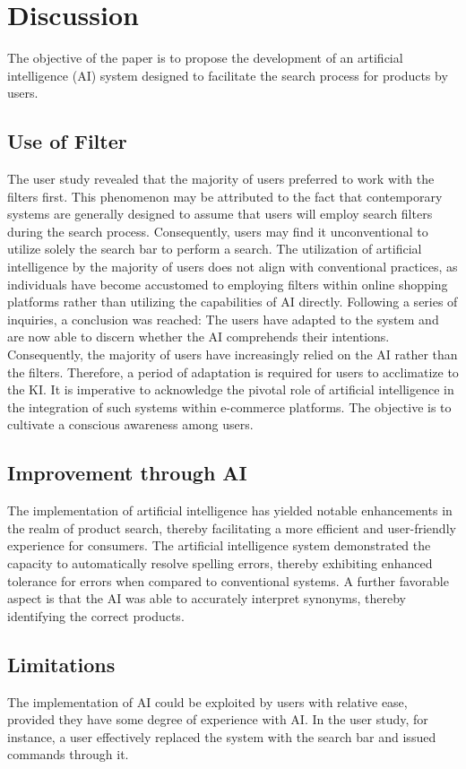 \documentclass[../../submission.tex]{subfiles}
\begin{document}
\section{Discussion}
The objective of the paper is to propose the development of an artificial intelligence (AI) system designed 
to facilitate the search process for products by users.

\subsection{Use of Filter}
The user study revealed that the majority of users preferred to work with the filters first. 
This phenomenon may be attributed to the fact that contemporary systems are generally designed to assume that users will 
employ search filters during the search process. Consequently, users may find it unconventional to utilize solely the 
search bar to perform a search. The utilization of artificial intelligence by the majority of users does not align with 
conventional practices, as individuals have become accustomed to employing filters within online shopping platforms rather 
than utilizing the capabilities of AI directly. Following a series of inquiries, a conclusion was reached: The users have 
adapted to the system and are now able to discern whether the AI comprehends their intentions. Consequently, the majority 
of users have increasingly relied on the AI rather than the filters. Therefore, a period of adaptation is required for 
users to acclimatize to the KI. It is imperative to acknowledge the pivotal role of artificial intelligence in the 
integration of such systems within e-commerce platforms. The objective is to cultivate a conscious awareness among users.

\subsection{Improvement through AI}
The implementation of artificial intelligence has yielded notable enhancements in the realm of product search, 
thereby facilitating a more efficient and user-friendly experience for consumers. The artificial intelligence system demonstrated 
the capacity to automatically resolve spelling errors, thereby exhibiting enhanced tolerance for errors when compared to conventional 
systems. A further favorable aspect is that the AI was able to accurately interpret synonyms, thereby identifying the correct products.

\subsection{Limitations}
The implementation of AI could be exploited by users with relative ease, provided 
they have some degree of experience with AI. In the user study, for instance, a user 
effectively replaced the system with the search bar and issued commands through it. 
\end{document}
